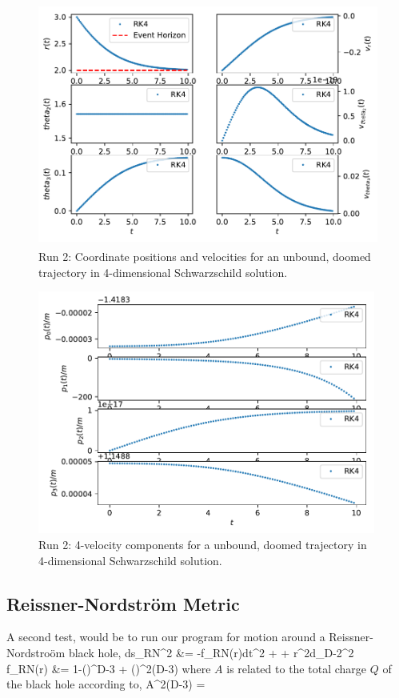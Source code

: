 \begin{figure}
	\centering
	\includegraphics[height=8cm]{Figures/xv_t_Falling.pdf}
	\caption[Run 2: Coordinate positions and velocities]{Run 2: Coordinate positions and velocities for an unbound, doomed trajectory in 4-dimensional Schwarzschild solution.}
	\label{fig:RUN2_xv}
\end{figure}

\begin{figure}
	\centering
	\includegraphics[height=8cm]{Figures/U_t_Falling.pdf}
	\caption[Run 2: 4-velocity]{Run 2: 4-velocity components for a unbound, doomed trajectory in 4-dimensional Schwarzschild solution.}
	\label{fig:RUN2_U}
\end{figure}

\subsection{Reissner-Nordstr\"{o}m Metric}
A second test, would be to run our program for motion around a Reissner-Nordstro\"{o}m black hole,
\be\ba
	ds_{RN}^2 &= -f_{RN}(r)dt^2 +  + r^2d\Omega_{D-2}^2 \\
	f_{RN}(r) &= 1-\left(\right)^{D-3} + \left(\right)^{2(D-3)}
\ea\ee
where $A$ is related to the total charge $Q$ of the black hole according to,
\be
	A^{2(D-3)} = 
\ee

